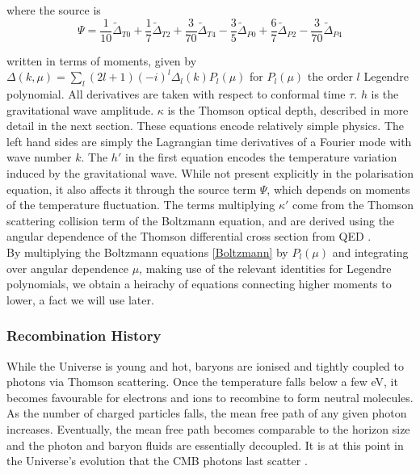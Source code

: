 \documentclass[a4paper,10pt]{article}
\begin{document}
where the source is
\begin{equation}
\Psi = \frac{1}{10}\tilde{\Delta}_{T0} + \frac{1}{7}\tilde{\Delta}_{T2} + \frac{3}{70}\tilde{\Delta}_{T4} - \frac{3}{5}\tilde{\Delta}_{P0} + \frac{6}{7}\tilde{\Delta}_{P2} - \frac{3}{70}\tilde{\Delta}_{P4}
\end{equation}

written in terms of moments, given by $\Delta(k, \mu) = \sum_l (2l+1)(-i)^l\Delta_l(k)P_l(\mu)$ for $P_l(\mu)$ the order $l$ Legendre polynomial. All derivatives are taken with respect to conformal time $\tau$. $h$ is the gravitational wave amplitude. $\kappa$ is the Thomson optical depth, described in more detail in the next section. These equations encode relatively simple physics. The left hand sides are simply the Lagrangian time derivatives of a Fourier mode with wave number $k$. The $h'$ in the first equation encodes the temperature variation induced by the gravitational wave. While not present explicitly in the polarisation equation, it also affects it through the source term $\Psi$, which depends on moments of the temperature fluctuation. The terms multiplying $\kappa'$ come from the Thomson scattering collision term of the Boltzmann equation, and are derived using the angular dependence of the Thomson differential cross section from QED \cite{QBM, kowosky}. \\

By multiplying the Boltzmann equations \ref{Boltzmann} by $P_l(\mu)$ and integrating over angular dependence $\mu$, making use of the relevant identities for Legendre polynomials, we obtain a heirachy of equations connecting higher moments to lower, a fact we will use later.

\subsubsection{Recombination History}

While the Universe is young and hot, baryons are ionised and tightly coupled to photons via Thomson scattering. Once the temperature falls below a few eV, it becomes favourable for electrons and ions to recombine to form neutral molecules. As the number of charged particles falls, the mean free path of any given photon increases. Eventually, the mean free path becomes comparable to the horizon size and the photon and baryon fluids are essentially decoupled. It is at this point in the Universe’s evolution that the CMB photons last scatter \cite{Pritchard}.\\
\end{document}
